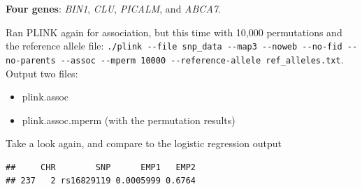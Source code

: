 \documentclass[]{article}
\newenvironment{Shaded}{\begin{snugshade}}{\end{snugshade}}
\newcommand{\KeywordTok}[1]{\textcolor[rgb]{0.13,0.29,0.53}{\textbf{#1}}}
\newcommand{\DataTypeTok}[1]{\textcolor[rgb]{0.13,0.29,0.53}{#1}}
\newcommand{\FloatTok}[1]{\textcolor[rgb]{0.00,0.00,0.81}{#1}}
\newcommand{\StringTok}[1]{\textcolor[rgb]{0.31,0.60,0.02}{#1}}
\newcommand{\CommentTok}[1]{\textcolor[rgb]{0.56,0.35,0.01}{\textit{#1}}}
\newcommand{\OtherTok}[1]{\textcolor[rgb]{0.56,0.35,0.01}{#1}}
\newcommand{\OperatorTok}[1]{\textcolor[rgb]{0.81,0.36,0.00}{\textbf{#1}}}
\newcommand{\NormalTok}[1]{#1}
\providecommand{\tightlist}{%
  \setlength{\itemsep}{0pt}\setlength{\parskip}{0pt}}
\begin{document}
\textbf{Four genes}: \emph{BIN1}, \emph{CLU}, \emph{PICALM}, and
\emph{ABCA7}.

Ran PLINK again for association, but this time with 10,000 permutations
and the reference allele file:
\texttt{./plink\ -\/-file\ snp\_data\ -\/-map3\ -\/-noweb\ -\/-no-fid\ -\/-no-parents\ -\/-assoc\ -\/-mperm\ 10000\ -\/-reference-allele\ ref\_alleles.txt}.
Output two files:

\begin{itemize}
\tightlist
\item
  plink.assoc
\item
  plink.assoc.mperm (with the permutation results)
\end{itemize}

Take a look again, and compare to the logistic regression output

\begin{Shaded}
\end{Shaded}

\begin{verbatim}
##     CHR        SNP      EMP1   EMP2
## 237   2 rs16829119 0.0005999 0.6764
\end{verbatim}

\begin{Shaded}
\end{Shaded}
\end{document}
